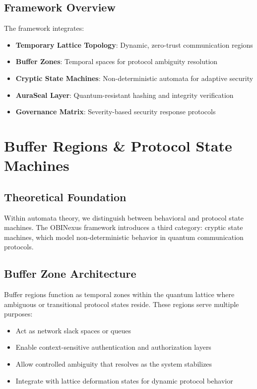 \documentclass[12pt,a4paper]{article}
\begin{document}
\subsection{Framework Overview}

The framework integrates:
\begin{itemize}
    \item \textbf{Temporary Lattice Topology}: Dynamic, zero-trust communication regions
    \item \textbf{Buffer Zones}: Temporal spaces for protocol ambiguity resolution
    \item \textbf{Cryptic State Machines}: Non-deterministic automata for adaptive security
    \item \textbf{AuraSeal Layer}: Quantum-resistant hashing and integrity verification
    \item \textbf{Governance Matrix}: Severity-based security response protocols
\end{itemize}

\section{Buffer Regions \& Protocol State Machines}

\subsection{Theoretical Foundation}

Within automata theory, we distinguish between behavioral and protocol state machines. The OBINexus framework introduces a third category: cryptic state machines, which model non-deterministic behavior in quantum communication protocols.

\subsection{Buffer Zone Architecture}

Buffer regions function as temporal zones within the quantum lattice where ambiguous or transitional protocol states reside. These regions serve multiple purposes:

\begin{tcolorbox}[colback=blue!5!white,colframe=blue!75!black,title=Buffer Zone Properties]
\begin{itemize}
    \item Act as network slack spaces or queues
    \item Enable context-sensitive authentication and authorization layers
    \item Allow controlled ambiguity that resolves as the system stabilizes
    \item Integrate with lattice deformation states for dynamic protocol behavior
\end{itemize}
\end{tcolorbox}
\end{document}
